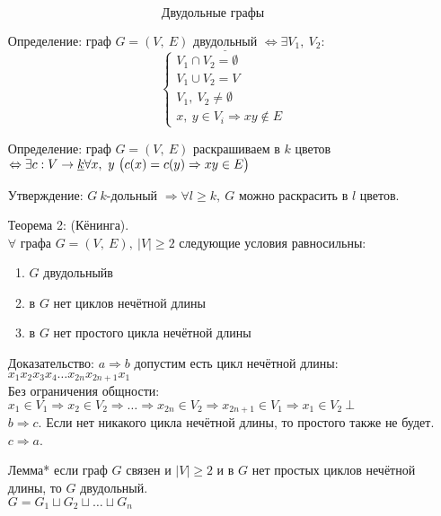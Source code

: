 \documentclass[12pt, letterpaper, twoside]{article}
\newcommand{\Underl}[1]{$\underline{\text{#1}}$}
\newcommand{\Abs}[1]{\left| #1 \right|}
\begin{document}
    \[\text{Двудольные графы}\]
    \begin{enumerate}
        \item[Определение:] граф $G = (V,\ E)$ \Underl{двудольный} $\Leftrightarrow \exists V_1,\ V_2:$\\
        \[\begin{cases}
            V_1 \cap V_2 = \emptyset\\
            V_1 \cup V_2 = V\\
            V_1,\ V_2 \neq \emptyset\\
            x,\ y\in V_i \Rightarrow xy \notin E
        \end{cases}\]
        \item[Определение:] граф $G = (V,\ E)$ раскрашиваем в $k$ цветов
        $\Leftrightarrow \exists c: V\rightarrow \underline{k}\\
        \forall  x,\ y\ \big(c(x) = c(y)\Rightarrow xy \in E\big)$
        \item[Утверждение:] $G\ k$-дольный $\Rightarrow \forall l \geq k,\ G$ можно раскрасить в $l$ цветов.
        \item[Теорема 2:] (Кёнинга).\\
        $\forall$ графа $G = (V,\ E),\ \Abs{V}\geq 2$ следующие условия равносильны:
        \begin{enumerate}
            \item $G$ двудольныйв
            \item в $G$ нет циклов нечётной длины
            \item в $G$ нет простого цикла нечётной длины
        \end{enumerate}
        \item[Доказательство:] $a\Rightarrow b$ допустим есть цикл нечётной длины:\\
        $x_1 x_2 x_3 x_4 \dots x_{2n} x_{2n + 1} x_1$\\
        Без ограничения общности:\\
        $x_1 \in V_1\Rightarrow x_2 \in V_2\Rightarrow\dots \Rightarrow x_{2n}\in V_2\Rightarrow x_{2n + 1}\in V_1 \Rightarrow x_1 \in V_2\ \bot$\\
        $b \Rightarrow c$. Если нет никакого цикла нечётной длины, то простого также не будет.
        $c \Rightarrow a$.
        \item[Лемма*] если граф $G$ связен и $|V| \geq 2$ и в $G$ нет простых циклов нечётной длины, то $G$ двудольный.\\
        $G = G_1 \sqcup G_2 \sqcup \dots \sqcup G_n$\\

\end{enumerate}
\end{document}
